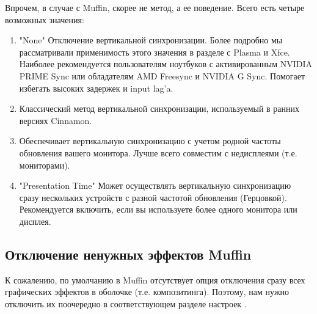 \documentclass[letterpaper,10pt,russian,openany]{sphinxmanual}
\begin{document}
\sphinxAtStartPar
Впрочем, в случае с Muffin, скорее не метод, а ее поведение. Всего есть четыре возможных значения:
\begin{enumerate}
%
\item {} 
\sphinxAtStartPar
"None" \sphinxhyphen{} Отключение вертикальной синхронизации.
Более подробно мы рассматривали применимость этого значения в разделе с Plasma и Xfce.
Наиболее рекомендуется пользователям ноутбуков с активированным NVIDIA PRIME Sync или обладателям AMD Freesync и NVIDIA G Sync.
Помогает избегать высоких задержек и input lag’a.

\item {} 
\sphinxAtStartPar
{} \sphinxhyphen{} Классический метод вертикальной синхронизации, используемый в ранних версиях Cinnamon.

\item {} 
\sphinxAtStartPar
{} \sphinxhyphen{} Обеспечивает вертикальную синхронизацию с учетом родной частоты обновления вашего монитора.
Лучше всего совместим с не\sphinxhyphen{}дисплеями (т.е. мониторами).

\item {} 
\sphinxAtStartPar
"Presentation Time" \sphinxhyphen{} Может осуществлять вертикальную синхронизацию сразу нескольких устройств с разной частотой обновления (Герцовкой).
Рекомендуется включить, если вы используете более одного монитора или дисплея.

\end{enumerate}

\ignorespaces 

\subsection{Отключение ненужных эффектов Muffin}
\label{\detokenize{source/de-optimizations:disabling-muffin-effects}}\label{\detokenize{source/de-optimizations:index-25}}\label{\detokenize{source/de-optimizations:id11}}
\sphinxAtStartPar
К сожалению, по умолчанию в Muffin отсутствует опция отключения сразу всех графических эффектов в оболочке (т.е. композитинга).
Поэтому, нам нужно отключить их поочередно в соответствующем разделе настроек .

\noindent{}
\end{document}
